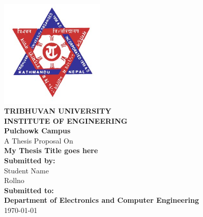 %
%
%
%
%
\begin{titlepage}
  \addtolength{\hoffset}{0.5\evensidemargin-0.5\oddsidemargin} %
  \noindent%
  
  \begin{center}
  	\includegraphics[width=50mm]{figures/tu.jpg}\\
  
\textsc{\LARGE \bfseries TRIBHUVAN UNIVERSITY}\\[0.5cm] %
\textsc{\large \bfseries INSTITUTE OF ENGINEERING}\\
\large \textbf{ Pulchowk Campus } \\[0.7cm]
\vspace{2cm}
A Thesis Proposal On \\[0.2cm]
\Large \textbf{My Thesis Title goes here}\\[0.5cm]
\vspace{2.2cm}
\textbf{Submitted by:}\\
\large{ Student Name   \\
 Rollno }\\
\vspace{2.2cm}
\textbf{Submitted to:}\\
\textbf{Department of Electronics and Computer Engineering}
\\[0.4cm]
\vspace{0.5cm}
{\large \today}
\end{center}
\end{titlepage}
\clearpage
